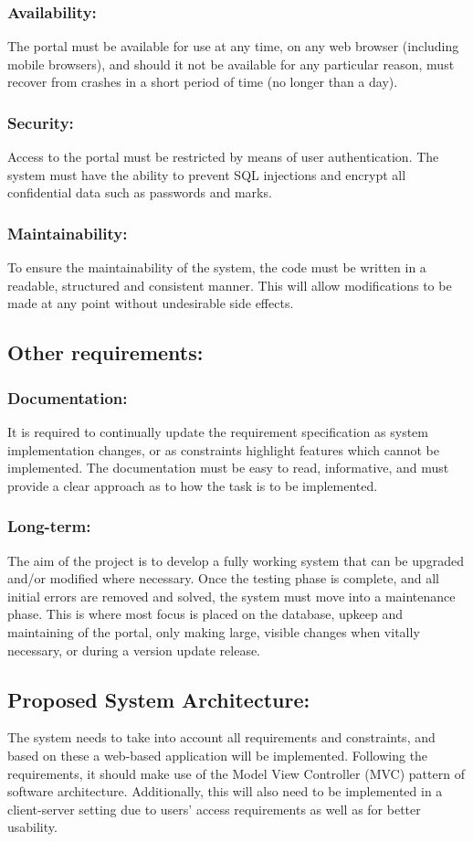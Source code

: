 \documentclass[paper=a4, fontsize=11pt]{scrartcl}
\numberwithin{equation}{section}		%
\numberwithin{figure}{section}			%
\numberwithin{table}{section}				%
\begin{document}
\subsubsection{Availability:}
The portal must be available for use at any time, on any web browser (including mobile
browsers), and should it not be available for any particular reason, must recover from
crashes in a short period of time (no longer than a day).

\subsubsection{Security:}
Access to the portal must be restricted by means of user authentication. The system must
have the ability to prevent SQL injections and encrypt all confidential data such as
passwords and marks.

\subsubsection{Maintainability:}
To ensure the maintainability of the system, the code must be written in a readable,
structured and consistent manner. This will allow modifications to be made at any point
without undesirable side effects.

\subsection{Other requirements:}
\subsubsection{Documentation:}
It is required to continually update the requirement specification as system implementation
changes, or as constraints highlight features which cannot be implemented. The
documentation must be easy to read, informative, and must provide a clear approach as to
how the task is to be implemented.

\subsubsection{Long-term:}
The aim of the project is to develop a fully working system that can be upgraded and/or
modified where necessary. Once the testing phase is complete, and all initial errors are
removed and solved, the system must move into a maintenance phase. This is where most
focus is placed on the database, upkeep and maintaining of the portal, only making large,
visible changes when vitally necessary, or during a version update release.
\\
\subsection{Proposed System Architecture:}
The system needs to take into account all requirements and constraints, and based on these
a web-based application will be implemented. Following the requirements, it should make
use of the Model View Controller (MVC) pattern of software architecture. Additionally, this
will also need to be implemented in a client-server setting due to users’ access requirements
as well as for better usability.


\end{document}
